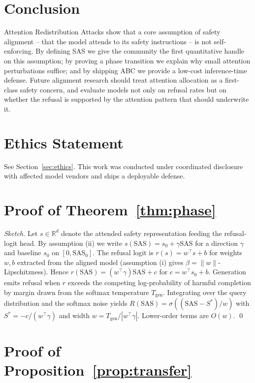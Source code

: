\documentclass[sigconf,anonymous=false,review=false]{acmart}
\theoremstyle{definition}
\theoremstyle{remark}
\newcommand{\SAS}{\mathrm{SAS}}
\newcommand{\R}{\mathbb{R}}
\begin{document}
\section{Conclusion}
\label{sec:conclusion}

Attention Redistribution Attacks show that a core assumption of safety alignment -- that the model attends to its safety instructions -- is not self-enforcing. By defining SAS we give the community the first quantitative handle on this assumption; by proving a phase transition we explain why small attention perturbations suffice; and by shipping ABC we provide a low-cost inference-time defense. Future alignment research should treat attention allocation as a first-class safety concern, and evaluate models not only on refusal rates but on whether the refusal is supported by the attention pattern that should underwrite it.

\section*{Ethics Statement}
See Section~\ref{sec:ethics}. This work was conducted under coordinated disclosure with affected model vendors and ships a deployable defense.




\appendix

\section{Proof of Theorem~\ref{thm:phase}}
\label{app:phase}

\emph{Sketch.} Let $s \in \R^d$ denote the attended safety representation feeding the refusal-logit head. By assumption (ii) we write $s(\SAS) = s_0 + \gamma \SAS$ for a direction $\gamma$ and baseline $s_0$ on $[0,\SAS_0]$. The refusal logit is $r(s) = w^\top s + b$ for weights $w,b$ extracted from the aligned model (assumption (i) gives $\beta = \|w\|$-Lipschitzness). Hence $r(\SAS) = (w^\top \gamma) \SAS + c$ for $c = w^\top s_0 + b$. Generation emits refusal when $r$ exceeds the competing log-probability of harmful completion by margin drawn from the softmax temperature $T_{\mathrm{gen}}$. Integrating over the query distribution and the softmax noise yields $R(\SAS) = \sigma((\SAS - S^*)/w)$ with $S^* = -c/(w^\top \gamma)$ and width $w = T_{\mathrm{gen}}/|w^\top \gamma|$. Lower-order terms are $O(w)$. \qed

\section{Proof of Proposition~\ref{prop:transfer}}
\label{app:transfer}
\end{document}
